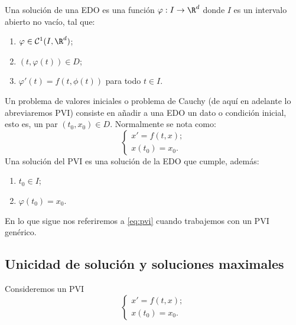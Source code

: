 \documentclass{article}
\begin{document}
  \begin{definition}
    Una solución de una EDO es una función $\varphi: I \to \R^d$ donde $I$ es un intervalo abierto
    no vacío, tal que:
    \begin{enumerate}
    \item $\varphi \in \mathcal{C}^1(I, \R^d)$;
    \item $(t, \varphi(t)) \in D$;
    \item $\varphi'(t) = f(t, \phi(t))$ para todo $t \in I$.
    \end{enumerate}

  \end{definition}

  \begin{definition}
    Un problema de valores iniciales o problema de Cauchy (de aquí en adelante lo abreviaremos PVI)
    consiste en añadir a una EDO un dato o condición inicial, esto es, un par $(t_0, x_0) \in D$.
    Normalmente se nota como:
    \begin{equation}
      \label{eq:pvi}
      \left\{
        \begin{array}{l}
          x' = f(t,x); \\
          x(t_0) = x_0.
        \end{array}
      \right.
      \tag{P}
    \end{equation}
    Una solución del PVI es una solución de la EDO que cumple, además:
    \begin{enumerate}
    \item $t_0 \in I$;
    \item $\varphi(t_0) = x_0$.
    \end{enumerate}
  \end{definition}

  En lo que sigue nos referiremos a \eqref{eq:pvi} cuando trabajemos con un PVI genérico. 
  
  \subsection{Unicidad de solución y soluciones maximales}

  Consideremos un PVI
  \begin{equation}
    \left\{
      \begin{array}{l}
        x' = f(t,x); \\
        x(t_0) = x_0.
      \end{array}
    \right.
    \tag{P}
  \end{equation}
\end{document}

